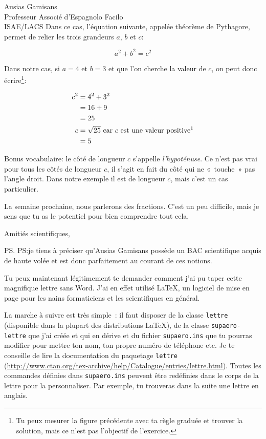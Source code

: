 \documentclass[pdftex,a4paper,12pt,origdate,fr]{supaero-lettre}
\begin{document}
\begin{letter}{Ausias Gamisans\\ Professeur Associé d'Espagnolo
    Facilo\\ISAE/LACS}
  Dans ce cas, l'équation suivante, appelée théorème de Pythagore,
  permet de relier les trois grandeurs $a$, $b$ et $c$:

    \begin{equation}
      \label{eq:1}
      a^2 + b^2 = c^2
    \end{equation}

Dans notre cas, si $a = 4$ et $b = 3$ et que l'on cherche la valeur de
$c$, on peut donc écrire\footnote{Tu peux mesurer la figure précédente
  avec ta règle graduée et trouver la solution, mais ce n'est pas
  l'objectif de l'exercice.}:

\begin{equation*}
  \begin{split}
    c^2 & = 4^2 + 3^2\\
     & = 16 + 9\\
     & = 25\\
    c & = \sqrt{25} \text{ car $c$ est une valeur
      positive\footnotemark}\\
      & = 5
  \end{split}
\end{equation*}


Bonus vocabulaire: le côté de longueur $c$ s'appelle
\emph{l'hypoténuse}. Ce n'est pas vrai pour tous les côtés de longueur
$c$, il s'agit en fait du côté qui ne «~touche~» pas l'angle
droit. Dans notre exemple il est de longueur $c$, mais c'est un cas
particulier.

La semaine prochaine, nous parlerons des fractions. C'est un peu
difficile, mais je sens que tu as le potentiel pour bien comprendre
tout cela.

\closing{Amitiés scientifiques,}

\ps{PS:}{je tiens à préciser qu'Ausias Gamisans possède un BAC scientifique
acquis de haute volée et est donc parfaitement au courant de ces
notions.}

\vspace{2cm}

Tu peux maintenant légitimement te demander comment j'ai pu taper
cette magnifique lettre sans Word. J'ai en effet utilisé \LaTeX, un
logiciel de mise en page pour les nains formaticiens et les
scientifiques en général.

La marche à suivre est très simple~: il faut disposer de la classe
\texttt{lettre} (disponible dans la plupart des distributions \LaTeX),
de la classe \texttt{supaero-lettre} que j'ai créée et qui en dérive
et du fichier \texttt{supaero.ins} que tu pourras modifier pour mettre
ton nom, ton propre numéro de téléphone etc. Je te conseille de lire
la documentation du paquetage \texttt{lettre}
(\url{http://www.ctan.org/tex-archive/help/Catalogue/entries/lettre.html}). Toutes
les commandes définies dans \texttt{supaero.ins} peuvent être
redéfinies dans le corps de la lettre pour la personnaliser. Par
exemple, tu trouveras dans la suite une lettre en anglais.


\end{letter}
\end{document}
